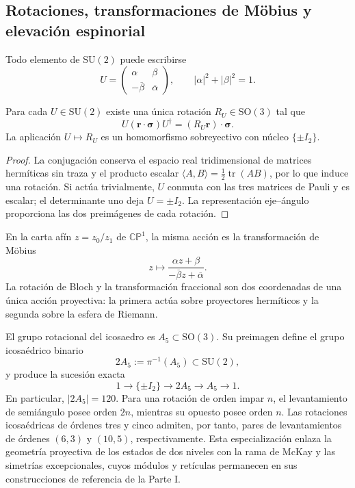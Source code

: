\subsection{Rotaciones, transformaciones de Möbius y elevación espinorial}

Todo elemento de \(\mathrm{SU}(2)\) puede escribirse
\[
 U=\begin{pmatrix}
 \alpha&\beta\\-\overline\beta&\overline\alpha
 \end{pmatrix},
 \qquad |\alpha|^2+|\beta|^2=1.
\]

\begin{theorem}
\label{thm:su2-so3-bloch-rev2}
Para cada \(U\in\mathrm{SU}(2)\) existe una única rotación
\(R_U\in\mathrm{SO}(3)\) tal que
\[
 U(\boldsymbol r\cdot\boldsymbol\sigma)U^\dagger
 =(R_U\boldsymbol r)\cdot\boldsymbol\sigma.
\]
La aplicación \(U\mapsto R_U\) es un homomorfismo sobreyectivo con núcleo
\(\{\pm I_2\}\).
\end{theorem}

\begin{proof}
La conjugación conserva el espacio real tridimensional de matrices
hermíticas sin traza y el producto escalar
\(\langle A,B\rangle=\tfrac12\operatorname{tr}(AB)\), por lo que induce una
rotación. Si actúa trivialmente, \(U\) conmuta con las tres matrices de Pauli
y es escalar; el determinante uno deja \(U=\pm I_2\). La representación
eje--ángulo proporciona las dos preimágenes de cada rotación.
\end{proof}

En la carta afín \(z=z_0/z_1\) de \(\mathbb {CP}^{1}\), la misma acción es
la transformación de Möbius
\[
 z\longmapsto
 \frac{\alpha z+\beta}{-\overline\beta z+\overline\alpha}.
\]
La rotación de Bloch y la transformación fraccional son dos coordenadas de
una única acción proyectiva: la primera actúa sobre proyectores hermíticos y
la segunda sobre la esfera de Riemann.

El grupo rotacional del icosaedro es \(A_5\subset\mathrm{SO}(3)\). Su
preimagen define el grupo icosaédrico binario
\[
 2A_5:=\pi^{-1}(A_5)\subset\mathrm{SU}(2),
\]
y produce la sucesión exacta
\begin{equation}
 1\longrightarrow\{\pm I_2\}
 \longrightarrow2A_5\longrightarrow A_5\longrightarrow1.
 \label{eq:extension-central-2a5-rev2}
\end{equation}
En particular, \(|2A_5|=120\). Para una rotación de orden impar \(n\), el
levantamiento de semiángulo posee orden \(2n\), mientras su opuesto posee
orden \(n\). Las rotaciones icosaédricas de órdenes tres y cinco admiten, por
tanto, pares de levantamientos de órdenes \((6,3)\) y \((10,5)\),
respectivamente. Esta especialización enlaza la
geometría proyectiva de los estados de dos niveles con la rama de McKay y las
simetrías excepcionales, cuyos módulos y retículas permanecen en sus
construcciones de referencia de la Parte I.

